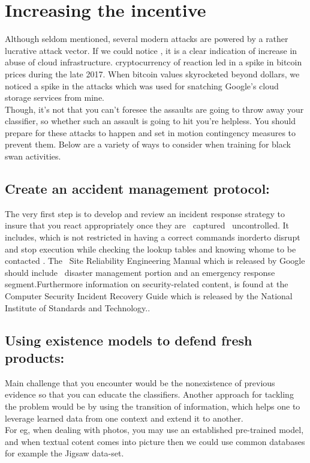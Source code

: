 \documentclass[journal,twoside,web]{ieeecolor}
\begin{document}
\section{Increasing the incentive}
Although seldom mentioned, several modern attacks are powered by a rather lucrative attack vector. If we could notice , it is a clear indication of  increase in abuse of cloud infrastructure. cryptocurrency of reaction  led in a spike in bitcoin prices during the late 2017. When bitcoin values skyrocketed beyond dollars, we noticed a spike in the attacks which was used for snatching Google's cloud storage services from mine.\\
Though, it's not that you can't foresee the assaults are going to throw away your classifier, so whether such an assault is going to hit you're helpless. You should prepare for these attacks to happen and set in motion contingency measures to prevent them. Below are a variety of ways to consider when training for black swan activities.\\

\subsection{Create an accident management protocol:}
The very first step is to develop and review an incident response strategy to insure that you react appropriately once they are  captured  uncontrolled. It includes, which is not restricted in having a correct commands inorderto disrupt and stop execution while checking the lookup tables and knowing whome to be contacted .
The  Site Reliability Engineering Manual which is released by Google should include  disaster management portion and an emergency response segment.Furthermore information on security-related content, is found at the Computer Security Incident Recovery Guide which is released by the National Institute of Standards and Technology..\\
\subsection{Using existence models to defend fresh products:} 
Main challenge that you encounter would be the nonexistence of previous evidence so that you can educate the classifiers. Another approach for tackling the problem would be by using the transition of information, which helps one to leverage learned data from one context and extend it to another.\\
For eg, when dealing with photos, you may use an established pre-trained model, and when  textual cotent comes into picture then we could use common databases for example the Jigsaw data-set.
\end{document}
